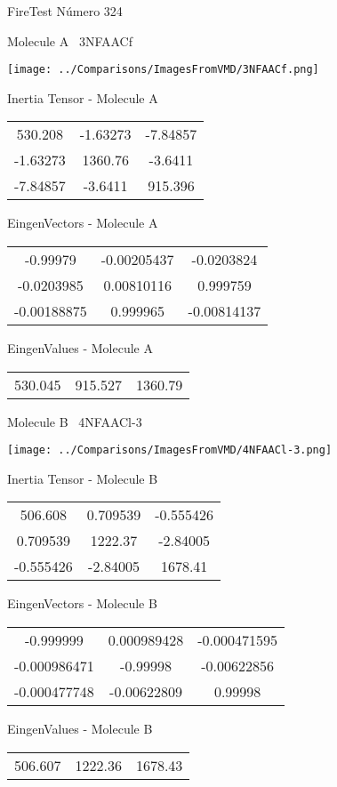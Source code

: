 \vtab[-3cm]
\begin{center}
{\large FireTest \tab Número 324}
\end{center}
\begin{multicols}{2}
\begin{center}

Molecule A \
3NFAACf

\texttt{[image: ../Comparisons/ImagesFromVMD/3NFAACf.png]}

Inertia Tensor - Molecule A \\
\begin{tabular}{|c c c|}
530.208	 & 	-1.63273	 & 	-7.84857	 \\
-1.63273	 & 	1360.76	 & 	-3.6411	 \\
-7.84857	 & 	-3.6411	 & 	915.396
\end{tabular}

\vtab
 EingenVectors - Molecule A     \\
\begin{tabular}{|c c c|}
-0.99979	 & 	-0.00205437	 & 	-0.0203824	 \\
-0.0203985	 & 	0.00810116	 & 	0.999759	 \\
-0.00188875	 & 	0.999965	 & 	-0.00814137
\end{tabular}

\vtab
 EingenValues - Molecule A     \\
\begin{tabular}{|c c c|}
530.045	 & 	915.527	 & 	1360.79	 \\
\end{tabular}
\columnbreak

Molecule B \
4NFAACl-3

\texttt{[image: ../Comparisons/ImagesFromVMD/4NFAACl-3.png]}

Inertia Tensor - Molecule B \\
\begin{tabular}{|c c c|}
506.608	 & 	0.709539	 & 	-0.555426	 \\
0.709539	 & 	1222.37	 & 	-2.84005	 \\
-0.555426	 & 	-2.84005	 & 	1678.41
\end{tabular}

\vtab
 EingenVectors - Molecule B     \\
\begin{tabular}{|c c c|}
-0.999999	 & 	0.000989428	 & 	-0.000471595	 \\
-0.000986471	 & 	-0.99998	 & 	-0.00622856	 \\
-0.000477748	 & 	-0.00622809	 & 	0.99998
\end{tabular}

\vtab
 EingenValues - Molecule B     \\
\begin{tabular}{|c c c|}
506.607	 & 	1222.36	 & 	1678.43	 \\
\end{tabular}

\end{center}
\end{multicols}

